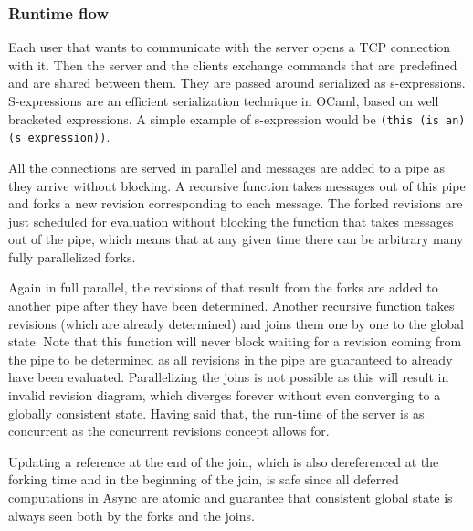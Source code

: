 \documentclass[12pt,twoside,notitlepage]{report}
\begin{document}
\subsubsection{Runtime flow}
Each user that wants to communicate with the server opens a TCP connection with it. Then the server and the clients exchange commands that are predefined and are shared between them. They are passed around serialized as s-expressions. S-expressions are an efficient serialization technique in OCaml, based on well bracketed expressions. A simple example of s-expression would be {\tt (this (is an) (s expression))}. 

All the connections are served in parallel and messages are added to a pipe as they arrive without blocking. A recursive function takes messages out of this pipe and forks a new revision corresponding to each message. The forked revisions are just scheduled for evaluation without blocking the function that takes messages out of the pipe, which means that at any given time there can be arbitrary many fully parallelized forks. 

Again in full parallel, the revisions of that result from the forks are added to another pipe after they have been determined. Another recursive function takes revisions (which are already determined) and joins them one by one to the global state. Note that this function will never block waiting for a revision coming from the pipe to be determined as all revisions in the pipe are guaranteed to already have been evaluated. Parallelizing the joins is not possible as this will result in invalid revision diagram, which diverges forever without even converging to a globally consistent state. Having said that, the run-time of the server is as concurrent as the concurrent revisions concept allows for.

Updating a reference at the end of the join, which is also dereferenced at the forking time and in the beginning of the join, is safe since all deferred computations in Async are atomic and guarantee that consistent global state is always seen both by the forks and the joins.  

\vspace*{5mm}
\end{document}
